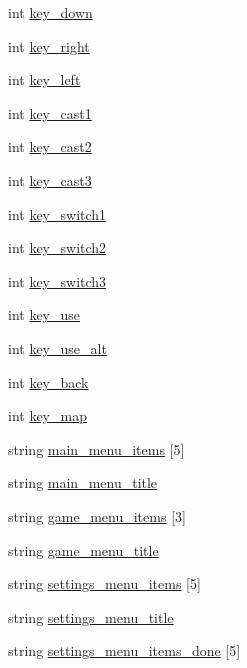 \begin{DoxyCompactItemize}
\item 
int \hyperlink{classc__game_a9b2d48164985c5c78b508d0aa8ef1c52}{key\-\_\-down}
\item 
int \hyperlink{classc__game_af6dab00f73f4853063cc4bab0f57d14d}{key\-\_\-right}
\item 
int \hyperlink{classc__game_ac7ad8ac5a68b60145bb9cddf323a5874}{key\-\_\-left}
\item 
int \hyperlink{classc__game_a40689f9da4ca424a96497ff916ea0c99}{key\-\_\-cast1}
\item 
int \hyperlink{classc__game_a2ccfddc860efc26f11a582780d5054b3}{key\-\_\-cast2}
\item 
int \hyperlink{classc__game_a425ae68160c7fa7447c5d4b1106e4260}{key\-\_\-cast3}
\item 
int \hyperlink{classc__game_ab9067838b721c66b6f85405c42d97819}{key\-\_\-switch1}
\item 
int \hyperlink{classc__game_a27d7c0789c4908c411476b0613a3077e}{key\-\_\-switch2}
\item 
int \hyperlink{classc__game_ab639463186d28277b420814ffed910e6}{key\-\_\-switch3}
\item 
int \hyperlink{classc__game_a43bdbd6b68af28861616fc6170be737d}{key\-\_\-use}
\item 
int \hyperlink{classc__game_a21fa6c7c14ef10dc9a02cc9d37142861}{key\-\_\-use\-\_\-alt}
\item 
int \hyperlink{classc__game_a2c57b2e7fd7e695208282a8cac2b2070}{key\-\_\-back}
\item 
int \hyperlink{classc__game_a8e13ca424701fcc322d110dd77a32387}{key\-\_\-map}
\item 
string \hyperlink{classc__game_a8cc35efdfce547a98732d6a3b56fcc92}{main\-\_\-menu\-\_\-items} \mbox{[}5\mbox{]}
\item 
string \hyperlink{classc__game_a5e32341c8fcd20ce470ff11765717e8d}{main\-\_\-menu\-\_\-title}
\item 
string \hyperlink{classc__game_ab8e77c697dcb6affc55ad8263f59afe7}{game\-\_\-menu\-\_\-items} \mbox{[}3\mbox{]}
\item 
string \hyperlink{classc__game_a7a1be955cd73845fcb5efd067959982e}{game\-\_\-menu\-\_\-title}
\item 
string \hyperlink{classc__game_a5d210224b8d881f8aa2d01d8adf981fd}{settings\-\_\-menu\-\_\-items} \mbox{[}5\mbox{]}
\item 
string \hyperlink{classc__game_aaa69654c55f2de1d29c769fa7045726f}{settings\-\_\-menu\-\_\-title}
\item 
string \hyperlink{classc__game_afc77c56ed33f68e53f9fec7ed2c17c14}{settings\-\_\-menu\-\_\-items\-\_\-done} \mbox{[}5\mbox{]}

\end{DoxyCompactItemize}
